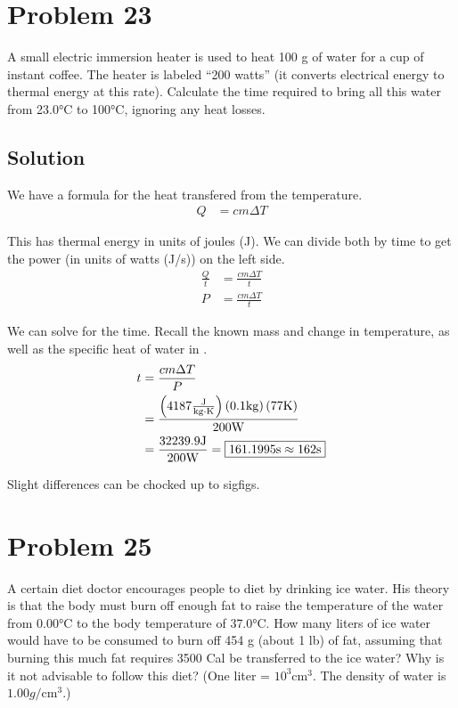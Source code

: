 \documentclass[12pt]{article}
\begin{document}
    \pagebreak
    \section{Problem 23}
        A small electric immersion heater is used to heat 100 g of water for a cup of instant coffee. 
        The heater is labeled “200 watts” (it converts electrical energy to thermal energy at this rate). 
        Calculate the time required to bring all this water from 23.0\unit{\celsius} to 100\unit{\celsius}, ignoring any heat losses.

        \subsection{Solution}
            We have a formula for the heat transfered from the temperature.
            \begin{align}
                Q   &=  cm \Delta T
            \end{align}

            This has thermal energy in units of joules (\unit{\joule}).
            We can divide both by time to get the power (in units of watts (\unit{\joule/\second})) on the left side.
            \begin{align}
                \frac{Q}{t} &=  \frac{cm \Delta T}{t}\\
                P   &=  \frac{cm \Delta T}{t}
            \end{align}

            We can solve for the time.
            Recall the known mass and change in temperature, as well as the specific heat of water in \unit{\frac{\joule}{\kilo\gram\cdot\kelvin}}.
            \begin{align}
                t   &=  \frac{cm \Delta T}{P}\\
                    &=  \frac{\left( 4187\unit{\frac{\joule}{\kilo\gram\cdot\kelvin}} \right) \left( 0.1 \unit{\kilo\gram} \right) \left( 77 \unit{\kelvin} \right)}{200 \unit{\watt}}\\
                    &=  \frac{32239.9 \unit{\joule}}{200 \unit{\watt}}
                    =   \boxed{161.1995 \unit{\second} \approx 162 \unit{\second}}
            \end{align}

            Slight differences can be chocked up to sigfigs. 

    \pagebreak
    \section{Problem 25}
        A certain diet doctor encourages people to diet by drinking ice water. 
        His theory is that the body must burn off enough fat to raise the temperature of the water from 0.00°C to the body temperature of 37.0°C. 
        How many liters of ice water would have to be consumed to burn off 454 g (about 1 lb) of fat, assuming that burning this much fat requires 3500 Cal be transferred to the ice water? 
        Why is it not advisable to follow this diet? (One liter = $10^3 \unit{\centi\meter^3}$. 
        The density of water is $1.00 \unit{g/\centi\meter^3}$.)
\end{document}
